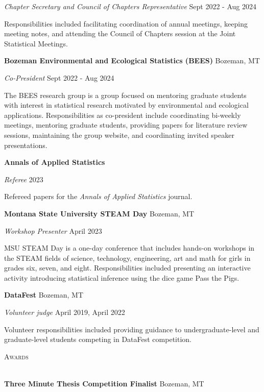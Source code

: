 \documentclass[a4paper]{article}
\newcommand{\lineunder} {
	\vspace*{-8pt} \\
	\hspace*{-18pt} \hrulefill \\
}
\newcommand{\header} [1] {
	{\hspace*{-18pt}\vspace*{6pt} \textcolor{Cerulean}{\textsc{#1}}}
	\vspace*{-6pt} \textcolor{Cerulean}{\lineunder}
}
\begin{document}
\emph{Chapter Secretary and Council of Chapters Representative}
\hfill Sept 2022 - Aug 2024

Responsibilities included facilitating coordination of annual meetings,
keeping meeting notes, and attending the Council of Chapters session at
the Joint Statistical Meetings. \vspace*{2mm}

\textbf{Bozeman Environmental and Ecological Statistics (BEES)}
\hfill Bozeman, MT

\emph{Co-President} \hfill Sept 2022 - Aug 2024

The BEES research group is a group focused on mentoring graduate
students with interest in statistical research motivated by
environmental and ecological applications. Responsibilities as
co-president include coordinating bi-weekly meetings, mentoring graduate
students, providing papers for literature review sessions, maintaining
the group website, and coordinating invited speaker presentations.
\vspace*{2mm}

\textbf{Annals of Applied Statistics}

\emph{Referee} \hfill 2023

Refereed papers for the \emph{Annals of Applied Statistics} journal.
\vspace*{2mm}

\textbf{Montana State University STEAM Day} \hfill Bozeman, MT

\emph{Workshop Presenter} \hfill April 2023

MSU STEAM Day is a one-day conference that includes hands-on workshops
in the STEAM fields of science, technology, engineering, art and math
for girls in grades six, seven, and eight. Responsibilities included
presenting an interactive activity introducing statistical inference
using the dice game Pass the Pigs. \vspace*{2mm}

\textbf{DataFest} \hfill Bozeman, MT

\emph{Volunteer judge} \hfill April 2019, April 2022

Volunteer responsibilities included providing guidance to
undergraduate-level and graduate-level students competing in DataFest
competition. \vspace*{2mm}

\header{Awards}
\vspace*{2mm}

\textbf{Three Minute Thesis Competition Finalist} \hfill Bozeman, MT
\end{document}
